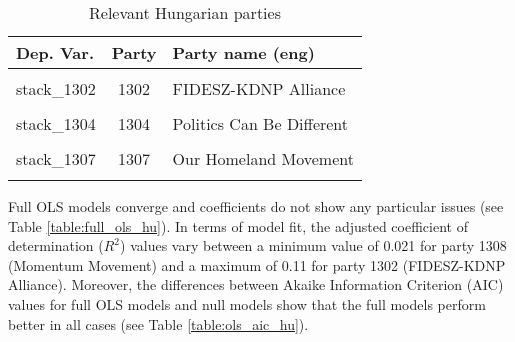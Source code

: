 \documentclass[
]{article}
\begin{document}
\begin{table}[!h]

\caption{\label{tab:unnamed-chunk-84}Relevant Hungarian parties \label{table:relprty_tab_hu}}
\centering
\begin{tabular}[t]{lcl}
\toprule
Dep. Var. & Party & Party name (eng)\\
\midrule
\cellcolor{gray!6}{stack\_1301} & \cellcolor{gray!6}{1301} & \cellcolor{gray!6}{Democratic Coalition}\\
stack\_1302 & 1302 & FIDESZ-KDNP Alliance\\
\cellcolor{gray!6}{stack\_1303} & \cellcolor{gray!6}{1303} & \cellcolor{gray!6}{Jobbik}\\
stack\_1304 & 1304 & Politics Can Be Different\\
\cellcolor{gray!6}{stack\_1306} & \cellcolor{gray!6}{1306} & \cellcolor{gray!6}{Hungarian Socialist Party}\\
\addlinespace
stack\_1307 & 1307 & Our Homeland Movement\\
\cellcolor{gray!6}{stack\_1308} & \cellcolor{gray!6}{1308} & \cellcolor{gray!6}{Momentum Movement}\\
\bottomrule
\end{tabular}
\end{table}

Full OLS models converge and coefficients do not show any particular issues (see Table
\ref{table:full_ols_hu}).
In terms of model fit, the adjusted coefficient of determination (\(R^2\)) values vary between
a minimum value of 0.021
for party 1308
(Momentum Movement)
and a maximum of 0.11
for party 1302
(FIDESZ-KDNP Alliance).
Moreover, the differences between Akaike Information Criterion (AIC) values for full OLS models and null
models show that the full models perform better in all cases (see Table \ref{table:ols_aic_hu}).
\end{document}
